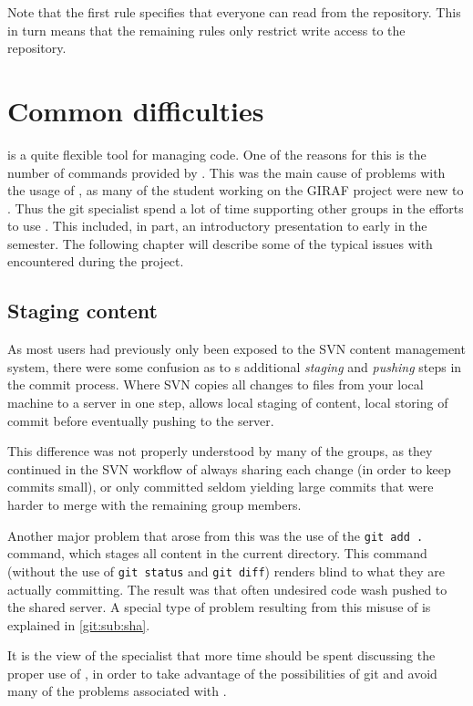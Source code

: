 Note that the first rule specifies that everyone can read from the repository.
This in turn means that the remaining rules only restrict write access to the repository.

\section{Common \git{} difficulties}
\Git{} is a quite flexible tool for managing code.
One of the reasons for this is the number of commands provided by \git{}.
This was the main cause of problems with the usage of \git{}, as many of the student working on the GIRAF project were new to \git{}.
Thus the git specialist spend a lot of time supporting other groups in the efforts to use \git{}.
This included, in part, an introductory presentation to \git{} early in the semester.
The following chapter will describe some of the typical issues with \git{} encountered during the project.

\subsection{Staging content}
As most users had previously only been exposed to the SVN content management system, there were some confusion as to \git{}s additional \textit{staging} and \textit{pushing} steps in the commit process.
Where SVN copies all changes to files from your local machine to a server in one step, \git{} allows local staging of content, local storing of commit before eventually pushing to the server.

This difference was not properly understood by many of the groups, as they continued in the SVN workflow of always sharing each change (in order to keep commits small), or only committed seldom yielding large commits that were harder to merge with the remaining group members.

Another major problem that arose from this was the use of the \texttt{git add .} command, which stages all content in the current directory.
This command (without the use of \texttt{git status} and \texttt{git diff}) renders \git{} blind to what they are actually committing.
The result was that often undesired code wash pushed to the shared server.
A special type of problem resulting from this misuse of \git{} is explained in \cref{git:sub:sha}.

It is the view of the \git{} specialist that more time should be spent discussing the proper use of \git{}, in order to take advantage of the possibilities of git and avoid many of the problems associated with \git{}.

